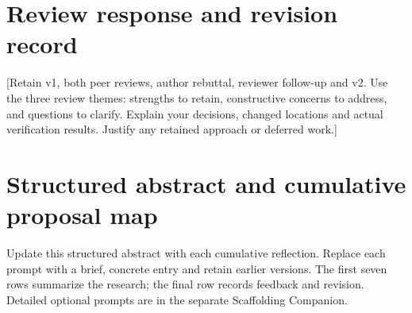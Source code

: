 \section{Review response and revision record}
[Retain v1, both peer reviews, author rebuttal, reviewer follow-up and v2. Use the three review themes: strengths to retain, constructive concerns to address, and questions to clarify. Explain your decisions, changed locations and actual verification results. Justify any retained approach or deferred work.]

\clearpage\onecolumn
\section{Structured abstract and cumulative proposal map}\label{app:abstract}
Update this structured abstract with each cumulative reflection. Replace each prompt with a brief, concrete entry and retain earlier versions. The first seven rows summarize the research; the final row records feedback and revision. Detailed optional prompts are in the separate Scaffolding Companion.
\par\medskip
